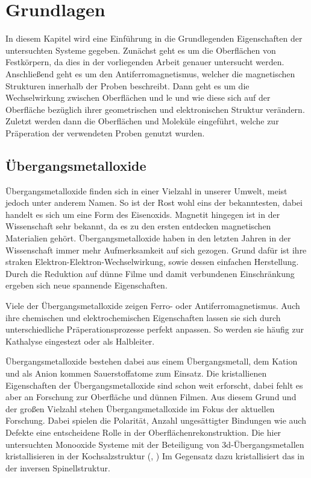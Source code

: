 \chapter{Grundlagen}
    In diesem Kapitel wird eine Einführung in die Grundlegenden Eigenschaften der untersuchten Systeme gegeben.
    Zunächst geht es um die Oberflächen von Festkörpern, da dies in der vorliegenden Arbeit genauer untersucht werden.
    Anschließend geht es um den Antiferromagnetismus, welcher die magnetischen Strukturen innerhalb der Proben beschreibt.
    Dann geht es um die Wechselwirkung zwischen Oberflächen und le und wie diese sich auf der Oberfläche bezüglich ihrer geometrischen und elektronischen Struktur verändern.
    Zuletzt werden dann die Oberflächen und Moleküle eingeführt, welche zur Präperation der verwendeten Proben genutzt wurden.

    \section{Übergangsmetalloxide}
        Übergangsmetalloxide finden sich in einer Vielzahl in unserer Umwelt, meist jedoch unter anderem Namen.
        So ist der Rost wohl eins der bekanntesten, dabei handelt es sich um eine Form des Eisenoxids.
        Magnetit hingegen ist in der Wissenschaft sehr bekannt, da es zu den ersten entdecken magnetischen Materialien gehört.
        Übergangsmetalloxide haben in den letzten Jahren in der Wissenschaft immer mehr Aufmerksamkeit auf sich gezogen.
        Grund dafür ist ihre straken Elektron-Elektron-Wechselwirkung, sowie dessen einfachen Herstellung.
        Durch die Reduktion auf dünne Filme und damit verbundenen Einschränkung ergeben sich neue spannende Eigenschaften.

        Viele der Übergangsmetalloxide zeigen Ferro- oder Antiferromagnetismus. 
        Auch ihre chemischen und elektrochemischen Eigenschaften lassen sie sich durch unterschiedliche Präperationsprozesse perfekt anpassen\cite{Uni-Tübingen}.
        So werden sie häufig zur Kathalyse eingestezt oder als Halbleiter.

        Übergangsmetalloxide bestehen dabei aus einem Übergangsmetall, dem Kation und als Anion kommen Sauerstoffatome zum Einsatz.
        Die kristallienen Eigenschaften der Übergangsmetalloxide sind schon weit erforscht, dabei fehlt es aber an Forschung zur Oberfläche und dünnen Filmen.
        Aus diesem Grund und der großen Vielzahl stehen Übergangsmetalloxide im Fokus der aktuellen Forschung.
        Dabei spielen die Polarität, Anzahl ungesättigter Bindungen wie auch Defekte eine entscheidene Rolle in der Oberflächenrekonstruktion.
        Die hier untersuchten Monooxide Systeme mit der Beteiligung von 3d-Übergangsmetallen kristallisieren in der Kochsalzstruktur (, )
        Im Gegensatz dazu kristallisiert das  in der inversen Spinellstruktur.

